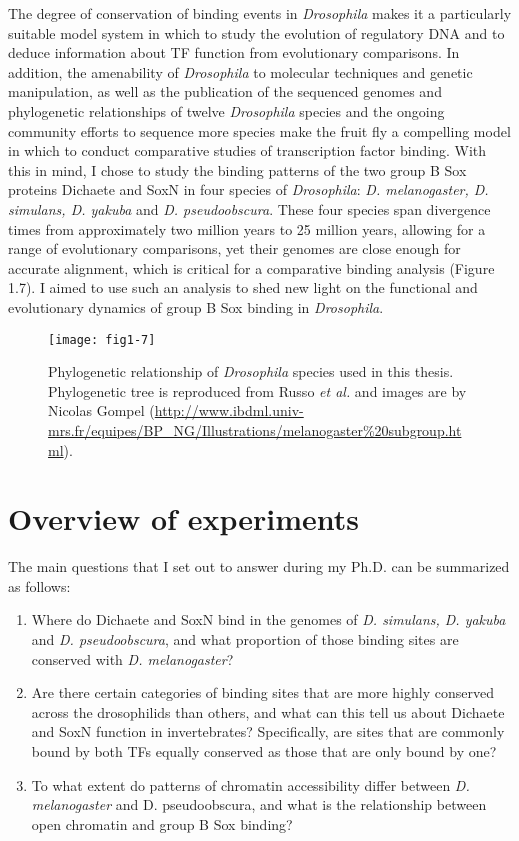 The degree of conservation of binding events in \emph{Drosophila} makes it a particularly suitable model system in which to study the evolution of regulatory DNA and to deduce information about TF function from evolutionary comparisons. In addition, the amenability of \emph{Drosophila} to molecular techniques and genetic manipulation, as well as the publication of the sequenced genomes and phylogenetic relationships of twelve \emph{Drosophila} species \citep{clark_evolution_2007} and the ongoing community efforts to sequence more species make the fruit fly a compelling model in which to conduct comparative studies of transcription factor binding. With this in mind, I chose to study the binding patterns of the two group B Sox proteins Dichaete and SoxN in four species of \emph{Drosophila}: \emph{D. melanogaster, D. simulans, D. yakuba} and \emph{D. pseudoobscura}. These four species span divergence times from approximately two million years to 25 million years, allowing for a range of evolutionary comparisons, yet their genomes are close enough for accurate alignment, which is critical for a comparative binding analysis \citep{russo_molecular_1995} (Figure 1.7). I aimed to use such an analysis to shed new light on the functional and evolutionary dynamics of group B Sox binding in \emph{Drosophila}.

\begin{figure}
\centering
\texttt{[image: fig1-7]}
\caption{Phylogenetic relationship of \emph{Drosophila} species used in this thesis. Phylogenetic tree is reproduced from Russo \emph{et al.} \citet{russo_molecular_1995} and images are by Nicolas Gompel (\url{http://www.ibdml.univ-mrs.fr/equipes/BP_NG/Illustrations/melanogaster\%20subgroup.html}).}
\label{Figure 1.7}
\end{figure}

\section{Overview of experiments}
The main questions that I set out to answer during my Ph.D. can be summarized as follows:
\begin{enumerate}
	\item Where do Dichaete and SoxN bind in the genomes of \emph{D. simulans, D. yakuba} and \emph{D. pseudoobscura}, and what proportion of those binding sites are conserved with \emph{D. melanogaster}?
	\item Are there certain categories of binding sites that are more highly conserved across the drosophilids than others, and what can this tell us about Dichaete and SoxN function in invertebrates? Specifically, are sites that are commonly bound by both TFs equally conserved as those that are only bound by one?
	\item To what extent do patterns of chromatin accessibility differ between \emph{D. melanogaster} and {D. pseudoobscura}, and what is the relationship between open chromatin and group B Sox binding?
\end{enumerate}

